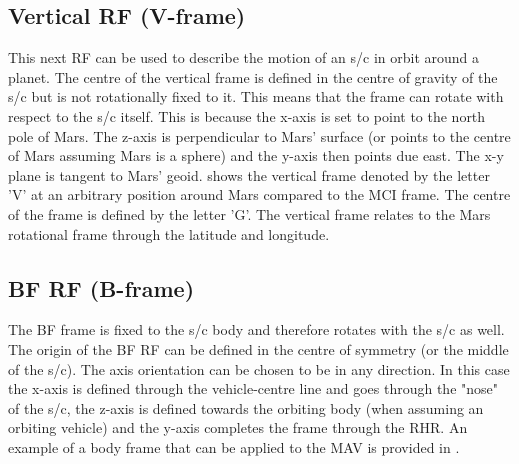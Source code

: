 \subsection{Vertical \ac{RF} (V-frame)}
\label{subsec:VCNE}
This next \ac{RF} can be used to describe the motion of an \ac{s/c} in orbit around a planet. The centre of the vertical frame is defined in the centre of gravity of the \ac{s/c} \citep{mooij2013fd} but is not rotationally fixed to it. This means that the frame can rotate with respect to the \ac{s/c} itself. This is because the x-axis is set to point to the north pole of Mars. The z-axis is perpendicular to Mars' surface (or points to the centre of Mars assuming Mars is a sphere) and the y-axis then points due east. The x-y plane is tangent to Mars' geoid.  shows the vertical frame denoted by the letter 'V' at an arbitrary position around Mars compared to the \ac{MCI} frame. The centre of the frame is defined by the letter 'G'. The vertical frame relates to the Mars rotational frame through the latitude and longitude. 




\subsection{\acl{BF} \ac{RF} (B-frame)}
\label{subsec:BF}
The \acf{BF} frame is fixed to the \ac{s/c} body and therefore rotates with the \ac{s/c} as well. The origin of the \ac{BF} \ac{RF} can be defined in the centre of symmetry (or the middle of the \ac{s/c}). The axis orientation can be chosen to be in any direction. In this case the x-axis is defined through the vehicle-centre line and goes through the "nose" of the \ac{s/c}, the z-axis is defined towards the orbiting body (when assuming an orbiting vehicle) and the y-axis completes the frame through the \ac{RHR}. An example of a body frame that can be applied to the \ac{MAV} is provided in . 


